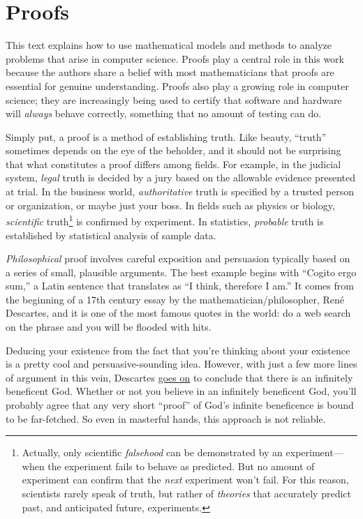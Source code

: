 \part{Proofs}
\label{part:proofs}

\partintro

This text explains how to use mathematical models and methods to analyze
problems that arise in computer science.  Proofs play a central role in
this work because the authors share a belief with most mathematicians that
proofs are essential for genuine understanding.  Proofs also play a
growing role in computer science; they are increasingly being used to
certify that software and hardware will \emph{always} behave correctly,
something that no amount of testing can do.

Simply put, a proof is a method of establishing truth.  Like beauty,
``truth'' sometimes depends on the eye of the beholder, and it should not
be surprising that what constitutes a proof differs among fields.  For
example, in the judicial system, \emph{legal} truth is decided by a jury
based on the allowable evidence presented at trial.  In the business
world, \emph{authoritative} truth is specified by a trusted person or
organization, or maybe just your boss.  In fields such as physics or
biology, \emph{scientific} truth\footnote{Actually, only scientific
  \emph{falsehood} can be demonstrated by an experiment---when the
  experiment fails to behave as predicted.  But no amount of experiment
  can confirm that the \emph{next} experiment won't fail.  For this
  reason, scientists rarely speak of truth, but rather of \emph{theories}
  that accurately predict past, and anticipated future,
  experiments.} is confirmed
by experiment.  In statistics, \emph{probable} truth is established by
statistical analysis of sample data.

\emph{Philosophical} proof involves careful exposition and
persuasion typically based on a series of small, plausible arguments.
The best example begins with ``Cogito ergo sum,'' a Latin sentence
that translates as ``I think, therefore I am.''  It comes from the
beginning of a 17th century essay by the mathematician/philosopher,
Ren\'e Descartes, and it is one of the most famous quotes in the
world: do a web search on the phrase and you will be flooded with
hits.

Deducing your existence from the fact that you're thinking about your
existence is a pretty cool and persuasive-sounding idea.  However,
with just a few more lines of argument in this vein, Descartes
\href{http://www.btinternet.com/~glynhughes/squashed/descartes.htm}{goes
  on} to conclude that there is an infinitely beneficent God.  Whether
or not you believe in an infinitely beneficent God, you'll probably
agree that any very short ``proof'' of God's infinite beneficence is
bound to be far-fetched.  So even in masterful hands, this approach is
not reliable.

